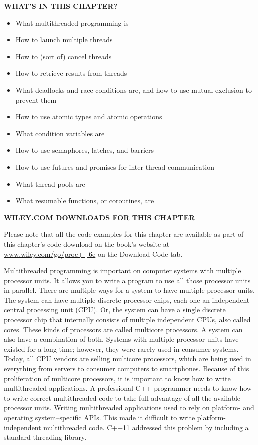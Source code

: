 \noindent
\textbf{WHAT’S IN THIS CHAPTER?}

\begin{itemize}
\item
What multithreaded programming is

\item
How to launch multiple threads

\item
How to (sort of) cancel threads

\item
How to retrieve results from threads

\item
What deadlocks and race conditions are, and how to use mutual exclusion to prevent them

\item
How to use atomic types and atomic operations

\item
What condition variables are

\item
How to use semaphores, latches, and barriers

\item
How to use futures and promises for inter-thread communication

\item
What thread pools are

\item
What resumable functions, or coroutines, are
\end{itemize}

\noindent
\textbf{WILEY.COM DOWNLOADS FOR THIS CHAPTER}

Please note that all the code examples for this chapter are available as part of this chapter’s code download on the book’s website at \url{www.wiley.com/go/proc++6e} on the Download Code tab.

Multithreaded programming is important on computer systems with multiple processor units. It allows you to write a program to use all those processor units in parallel. There are multiple ways for a system to have multiple processor units. The system can have multiple discrete processor chips, each one an independent central processing unit (CPU). Or, the system can have a single discrete processor chip that internally consists of multiple independent CPUs, also called cores. These kinds of processors are called multicore processors. A system can also have a combination of both. Systems with multiple processor units have existed for a long time; however, they were rarely used in consumer systems. Today, all CPU vendors are selling multicore processors, which are being used in everything from servers to consumer computers to smartphones. Because of this proliferation of multicore processors, it is important to know how to write multithreaded applications. A professional C++ programmer needs to know how to write correct multithreaded code to take full advantage of all the available processor units. Writing multithreaded applications used to rely on platform- and operating system–specific APIs. This made it difficult to write platform-independent multithreaded code. C++11 addressed this problem by including a standard threading library.

